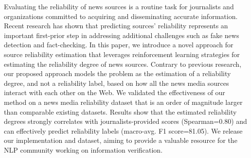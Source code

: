 Evaluating the reliability of news sources is a routine task for journalists and organizations committed to acquiring and disseminating accurate information. Recent research has shown that predicting sources' reliability represents an important first-prior step in addressing additional challenges such as fake news detection and fact-checking. In this paper, we introduce a novel approach for source reliability estimation that leverages reinforcement learning strategies for estimating the reliability degree of news sources. Contrary to previous research, our proposed approach models the problem as the estimation of a reliability degree, and not a reliability label, based on how all the news media sources interact with each other on the Web. We validated the effectiveness of our method on a news media reliability dataset that is an order of magnitude larger than comparable existing datasets. Results show that the estimated reliability degrees strongly correlates with journalists-provided scores (Spearman=0.80) and can effectively predict reliability labels (macro-avg. F1 score=81.05). We release our implementation and dataset, aiming to provide a valuable resource for the NLP community working on information verification.